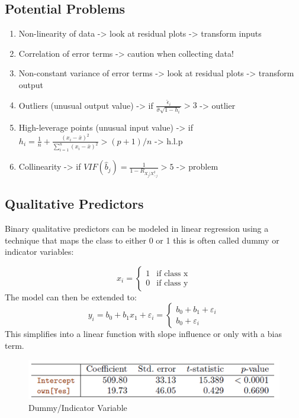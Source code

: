 \documentclass[../Main.tex]{subfiles}
\begin{document}
\subsection{Potential Problems}
\begin{enumerate}
    \item Non-linearity of data -> look at residual plots -> transform inputs
    \item Correlation of error terms -> caution when collecting data!
    \item Non-constant variance of error terms -> look at residual plots -> transform output
    \item Outliers (unusual output value) -> if \(\frac{\hat{\epsilon}_i}{\hat{\sigma}\sqrt{1-h_i}}>3\) -> outlier
    \item High-leverage points (unusual input value) -> if \(h_i = \frac{1}{n} + \frac{(x_i - \bar{x})^2}{\sum_{i=1}^{n} (x_i - \bar{x})^2} > (p+1)/n\) -> h.l.p
    \item Collinearity -> if \(VIF(\hat{b}_j) = \frac{1}{1-R_{X_j|X_{-j}^2}}>5\) -> problem
\end{enumerate}

\subsection{Qualitative Predictors}
Binary qualitative predictors can be modeled in linear regression using a technique that maps
the class to either 0 or 1 this is often called dummy or indicator variables:

\begin{equation}
    x_i = \begin{cases}
        1 & \text{if class x}\\
        0 & \text{if class y}
    \end{cases}
\end{equation}
The model can then be extended to:
\begin{equation}
    y_i = b_0 + b_1 x_1 + \varepsilon_i = \begin{cases}
        b_0 + b_1 + \varepsilon_i \\
        b_0 + \varepsilon_i 
    \end{cases}
\end{equation}
This simplifies into a linear function with slope influence or only with a bias term.

\begin{figure}[H]
    \centering
    \includegraphics[width=0.75\linewidth]{Images/indicator-function.png}
    \caption{Dummy/Indicator Variable}
\end{figure}
\end{document}

